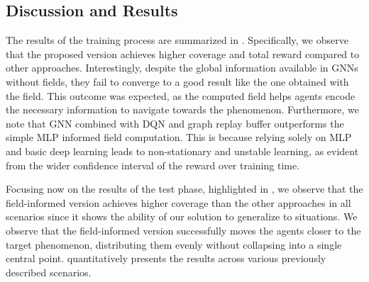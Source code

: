 \subsection{Discussion and Results}
The results of the training process are summarized in .
% 
%
Specifically, we observe that the proposed version achieves higher coverage and total reward compared to other approaches. 
%
Interestingly, despite the global information available in \acp{GNN} without fields, they fail to converge to a good result like the one obtained with the field. 
%
This outcome was expected, as the computed field helps agents encode the necessary information to navigate towards the phenomenon.
%
Furthermore, we note that \ac{GNN} combined with \ac{DQN} and graph replay buffer outperforms the simple \ac{MLP} informed field computation. 
%
This is because relying solely on \ac{MLP} and basic deep learning leads to non-stationary and unstable learning, 
 as evident from the wider confidence interval of the reward over training time.

Focusing now on the results of the test phase, highlighted in  ,
 we observe that the field-informed version achieves higher coverage than the other approaches in all scenarios since it shows the ability of our solution to generalize to situations. 
% 
We observe that the field-informed version successfully moves the agents closer to the target phenomenon, 
 distributing them evenly without collapsing into a single central point. 
  quantitatively presents the results across various previously described scenarios.

